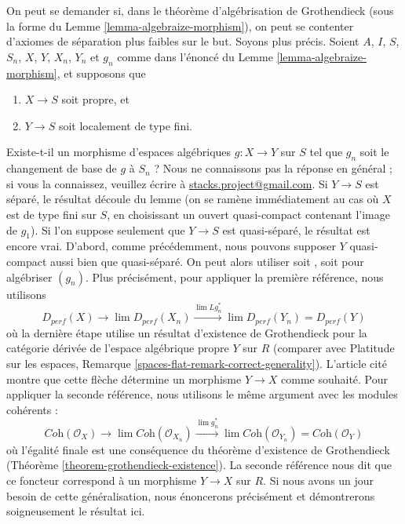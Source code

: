 \begin{remark}
\label{remark-weaken-separation-axioms-question}
On peut se demander si, dans le théorème d'algébrisation de Grothendieck (sous la forme
du Lemme \ref{lemma-algebraize-morphism}), on peut se contenter
d'axiomes de séparation plus faibles sur le but. Soyons plus précis.
Soient $A$, $I$, $S$, $S_n$, $X$, $Y$, $X_n$, $Y_n$ et $g_n$ comme dans
l'énoncé du Lemme \ref{lemma-algebraize-morphism}, et supposons que
\begin{enumerate}
\item $X \to S$ soit propre, et
\item $Y \to S$ soit localement de type fini.
\end{enumerate}
Existe-t-il un morphisme d'espaces algébriques $g : X \to Y$
sur $S$ tel que $g_n$ soit le changement de base de $g$ à $S_n$ ?
Nous ne connaissons pas la réponse en général ; si vous la connaissez, veuillez écrire à
\href{mailto:stacks.project@gmail.com}{stacks.project@gmail.com}.
Si $Y \to S$ est séparé, le résultat
découle du lemme (on se ramène immédiatement au cas où
$X$ est de type fini sur $S$, en choisissant un ouvert quasi-compact
contenant l'image de $g_1$). Si l'on suppose seulement que $Y \to S$
est quasi-séparé, le résultat est encore vrai. D'abord, comme précédemment,
nous pouvons supposer $Y$ quasi-compact aussi bien que quasi-séparé.
On peut alors utiliser soit \cite{Bhatt-Algebraize}, soit
\cite{Hall-Rydh-coherent} pour algébriser $(g_n)$. Plus précisément, pour appliquer
la première référence, nous utilisons
$$
D_{perf}(X) \to \lim D_{perf}(X_n)
\xrightarrow{\lim Lg_n^*}
\lim D_{perf}(Y_n) = D_{perf}(Y)
$$
où la dernière étape utilise un résultat d'existence de Grothendieck pour
la catégorie dérivée de l'espace algébrique propre $Y$ sur $R$
(comparer avec
Platitude sur les espaces, Remarque \ref{spaces-flat-remark-correct-generality}).
L'article cité montre que
cette flèche détermine un morphisme $Y \to X$ comme souhaité. Pour appliquer la
seconde référence, nous utilisons le même argument avec les modules cohérents :
$$
\textit{Coh}(\mathcal{O}_X) \to \lim \textit{Coh}(\mathcal{O}_{X_n})
\xrightarrow{\lim g_n^*}
\lim \textit{Coh}(\mathcal{O}_{Y_n}) = \textit{Coh}(\mathcal{O}_Y)
$$
où l'égalité finale est une conséquence du théorème d'existence de Grothendieck
(Théorème \ref{theorem-grothendieck-existence}).
La seconde référence nous dit que ce foncteur correspond à un
morphisme $Y \to X$ sur $R$. Si nous avons un jour besoin de cette généralisation,
nous énoncerons précisément et démontrerons soigneusement le résultat ici.
\end{remark}

